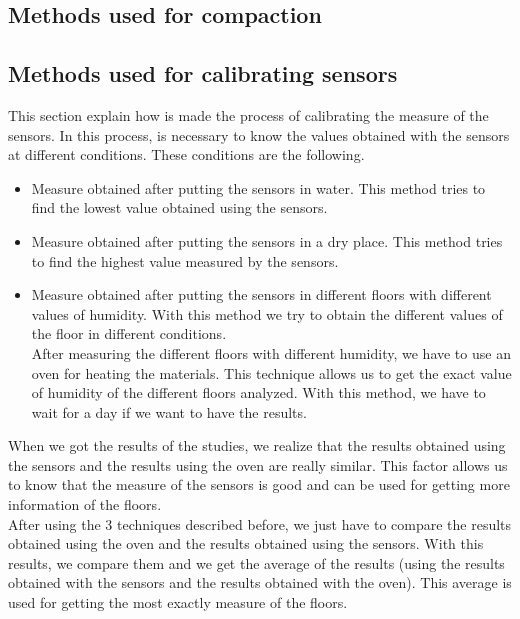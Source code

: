 \subsection{Methods used for compaction}

\subsection{Methods used for calibrating sensors}

This section explain how is made the process of calibrating the measure of the sensors. In this process, is necessary to know the values obtained with the sensors at different conditions. These conditions are the following.

\begin{itemize}

\item Measure obtained after putting the sensors in water. This method tries to find the lowest value obtained using the sensors.

\item Measure obtained after putting the sensors in a dry place. This method tries to find the highest value measured by the sensors.

\item Measure obtained after putting the sensors in different floors with different values of humidity. With this method we try to obtain the different values of the floor in different conditions.\\

After measuring the different floors with different humidity, we have to use an oven for heating the materials. This technique allows us to get the exact value of humidity of the different floors analyzed. With this method, we have to wait for a day if we want to have the results.

\end{itemize}

When we got the results of the studies, we realize that the results obtained using the sensors and the results using the oven are really similar. This factor allows us to know that the measure of the sensors is good and can be used for getting more information of the floors.\\

After using the 3 techniques described before, we just have to compare the results obtained using the oven and the results obtained using the sensors. With this results, we compare them and we get the average of the results (using the results obtained with the sensors and the results obtained with the oven). This average is used for getting the most exactly measure of the floors.

